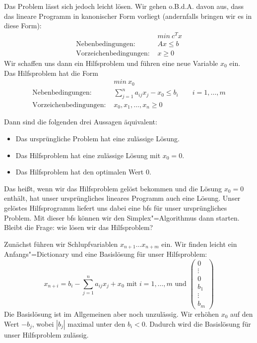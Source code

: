 Das Problem lässt sich jedoch leicht lösen. Wir gehen o.B.d.A. davon aus, dass das lineare Programm in kanonischer Form vorliegt (andernfalls bringen wir es in diese Form):
\begin{align*}
    & min~c^Tx\\
  \text{Nebenbedingungen: } & Ax \le b\\
  \text{Vorzeichenbedingungen: } & x \ge 0
\end{align*}
Wir schaffen uns dann ein Hilfsproblem und führen eine neue Variable $x_0$ ein. Das Hilfsproblem hat die Form
\begin{align*}
  & min~x_0\\
    \text{Nebenbedingungen: } & \sum_{j=1}^n a_{ij}x_j - x_0 \le b_i \qquad i=1, \ldots, m \\
    \text{Vorzeichenbedingungen: } & x_0, x_1, \ldots, x_n \ge 0
\end{align*}

Dann sind die folgenden drei Aussagen äquivalent:
\begin{itemize}
  \item Das ursprüngliche Problem hat eine zulässige Lösung.
  \item Das Hilfsproblem hat eine zulässige Lösung mit $x_0 = 0$.
  \item Das Hilfsproblem hat den optimalen Wert $0$.
\end{itemize}

Das heißt, wenn wir das Hilfsproblem gelöst bekommen und die Lösung $x_0 = 0$ enthält, hat unser ursprüngliches lineares Programm auch eine Lösung. Unser gelöstes Hilfsprogramm liefert uns dabei eine bfs für unser ursprüngliches Problem. Mit dieser bfs können wir den Simplex"=Algorithmus dann starten. Bleibt die Frage: wie lösen wir das Hilfsproblem?

Zunächst führen wir Schlupfvariablen $x_{n+1} \ldots x_{n+m}$ ein. Wir finden leicht ein Anfangs"=Dictionary und eine Basislösung für unser Hilfsproblem: 
\[ x_{n+i} = b_i - \sum_{j=1}^n a_{ij}x_j + x_0 \text{ mit } i=1, \ldots, m \text{ und } \begin{pmatrix} 0 \\ \vdots \\ 0 \\ b_1 \\ \vdots \\ b_m \end{pmatrix} \]
Die Basislösung ist im Allgemeinen aber noch unzulässig. Wir erhöhen $x_0$ auf den Wert $-b_j$, wobei $|b_j|$ maximal unter den $b_i < 0$. Dadurch wird die Basislösung für unser Hilfsproblem zulässig.

